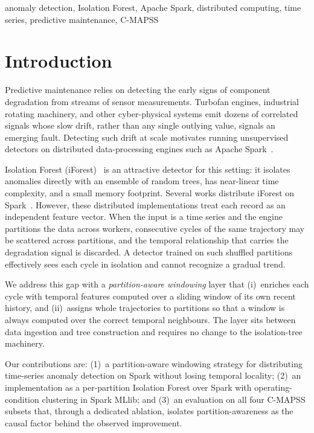 \documentclass[conference]{IEEEtran}
\begin{document}
\begin{IEEEkeywords}
anomaly detection, Isolation Forest, Apache Spark, distributed computing, time series, predictive maintenance, C-MAPSS
\end{IEEEkeywords}

\section{Introduction}
Predictive maintenance relies on detecting the early signs of component degradation from streams of sensor measurements. Turbofan engines, industrial rotating machinery, and other cyber-physical systems emit dozens of correlated signals whose slow drift, rather than any single outlying value, signals an emerging fault. Detecting such drift at scale motivates running unsupervised detectors on distributed data-processing engines such as Apache Spark~\cite{zaharia2012rdd}.

Isolation Forest (iForest)~\cite{liu2008isolation,liu2012isolation} is an attractive detector for this setting: it isolates anomalies directly with an ensemble of random trees, has near-linear time complexity, and a small memory footprint. Several works distribute iForest on Spark~\cite{togbe2022distributed,titicaca,linkedin}. However, these distributed implementations treat each record as an independent feature vector. When the input is a time series and the engine partitions the data across workers, consecutive cycles of the same trajectory may be scattered across partitions, and the temporal relationship that carries the degradation signal is discarded. A detector trained on such shuffled partitions effectively sees each cycle in isolation and cannot recognize a gradual trend.

We address this gap with a \emph{partition-aware windowing} layer that (i)~enriches each cycle with temporal features computed over a sliding window of its own recent history, and (ii)~assigns whole trajectories to partitions so that a window is always computed over the correct temporal neighbours. The layer sits between data ingestion and tree construction and requires no change to the isolation-tree machinery.

Our contributions are: (1)~a partition-aware windowing strategy for distributing time-series anomaly detection on Spark without losing temporal locality; (2)~an implementation as a per-partition Isolation Forest over Spark with operating-condition clustering in Spark MLlib; and (3)~an evaluation on all four C-MAPSS subsets that, through a dedicated ablation, isolates partition-awareness as the causal factor behind the observed improvement.
\end{document}
